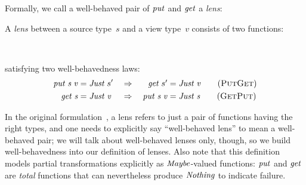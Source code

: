 Formally, we call a well-behaved pair of \ensuremath{\Varid{put}} and \ensuremath{\Varid{get}} a \emph{lens}:
\begin{definition}[lens]
A \emph{lens} between a source type~$s$ and a view type~$v$ consists of two functions:
\begin{hscode}\SaveRestoreHook
{}%
%
%
%
\>[B]{}\<[6]%
\>[6]{}\mathbin{::}\to {}\<[17]%
\>[17]{}\to {}\;\<[E]%
\\
\>[B]{}\<[6]%
\>[6]{}\mathbin{::}\<[17]%
\>[17]{}\to {}\;\<[E]%
\ColumnHook
\end{hscode}\resethooks
satisfying two well-behavedness laws:
\begin{align}
\ensuremath{\Varid{put}\;\Varid{s}\;\Varid{v}} = \ensuremath{\Conid{Just}\;s^\prime} \quad&\Rightarrow\quad \phantom{\ensuremath{\Varid{put}\;\Varid{s}\;\Varid{v}}}\llap{\ensuremath{\Varid{get}\;s^\prime}} = \ensuremath{\Conid{Just}\;\Varid{v}} \tag{\textsc{PutGet}} \label{eq:PutGet} \\
\ensuremath{\Varid{get}\;\Varid{s}} = \rlap{\ensuremath{\Conid{Just}\;\Varid{v}}}\phantom{\ensuremath{\Conid{Just}\;s^\prime}} \quad&\Rightarrow\quad \ensuremath{\Varid{put}\;\Varid{s}\;\Varid{v}} = \ensuremath{\Conid{Just}\;\Varid{s}} \tag{\textsc{GetPut}} \label{eq:GetPut}
\end{align}
\end{definition}
In the original formulation~\cite{Lenses}, a lens refers to just a pair of functions having the right types, and one needs to explicitly say ``well-behaved lens'' to mean a well-behaved pair; we will talk about well-behaved lenses only, though, so we build well-behavedness into our definition of lenses.
Also note that this definition models partial transformations explicitly as \ensuremath{\Conid{Maybe}}-valued functions: \ensuremath{\Varid{put}} and \ensuremath{\Varid{get}} are \emph{total} functions that can nevertheless produce \ensuremath{\Conid{Nothing}} to indicate failure.

